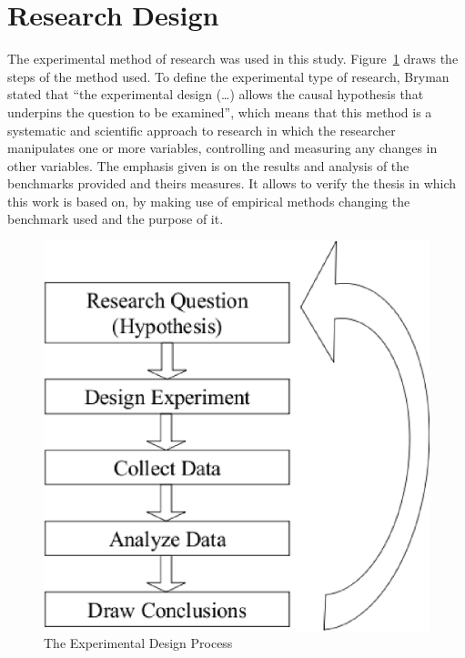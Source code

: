 \section{Research Design} \label{sec3:research_design} 
    The experimental method of research was used in this study. Figure~\ref{fig:experimental_method_approach} draws the steps of the method used. To define the experimental type of research, Bryman \cite{bryman89} stated that ``the experimental design (\ldots) allows the causal hypothesis that underpins the question to be examined'', which means that this method is a systematic and scientific approach to research in which the researcher manipulates one or more variables, controlling and measuring any changes in other variables. The emphasis given is on the results and analysis of the benchmarks provided and theirs measures. It allows to verify the thesis in which this work is based on, by making use of empirical methods changing the benchmark used and the purpose of it.
    \begin{figure}[!htb]
        \centering
            \includegraphics[scale=0.5]{graphics/experimental_method_approach}
            \caption{The Experimental Design Process}
            \label{fig:experimental_method_approach}
    \end{figure}
    
